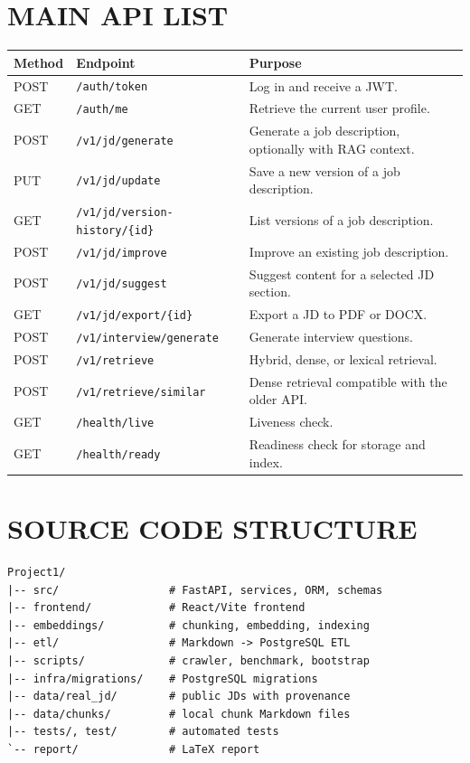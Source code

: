 \documentclass[12pt,a4paper,oneside]{report}
\newcommand{\code}[1]{\texttt{#1}}
\begin{document}
\chapter{MAIN API LIST}
\label{app:api}
\begin{longtable}{p{2cm}p{5.4cm}p{7cm}}
\toprule
\textbf{Method} & \textbf{Endpoint} & \textbf{Purpose}\\
\midrule
POST & \code{/auth/token} & Log in and receive a JWT.\\
GET & \code{/auth/me} & Retrieve the current user profile.\\
POST & \code{/v1/jd/generate} & Generate a job description, optionally with RAG context.\\
PUT & \code{/v1/jd/update} & Save a new version of a job description.\\
GET & \code{/v1/jd/version-history/\{id\}} & List versions of a job description.\\
POST & \code{/v1/jd/improve} & Improve an existing job description.\\
POST & \code{/v1/jd/suggest} & Suggest content for a selected JD section.\\
GET & \code{/v1/jd/export/\{id\}} & Export a JD to PDF or DOCX.\\
POST & \code{/v1/interview/generate} & Generate interview questions.\\
POST & \code{/v1/retrieve} & Hybrid, dense, or lexical retrieval.\\
POST & \code{/v1/retrieve/similar} & Dense retrieval compatible with the older API.\\
GET & \code{/health/live} & Liveness check.\\
GET & \code{/health/ready} & Readiness check for storage and index.\\
\bottomrule
\end{longtable}

\chapter{SOURCE CODE STRUCTURE}
\begin{lstlisting}[caption={Main source-code structure}]
Project1/
|-- src/                 # FastAPI, services, ORM, schemas
|-- frontend/            # React/Vite frontend
|-- embeddings/          # chunking, embedding, indexing
|-- etl/                 # Markdown -> PostgreSQL ETL
|-- scripts/             # crawler, benchmark, bootstrap
|-- infra/migrations/    # PostgreSQL migrations
|-- data/real_jd/        # public JDs with provenance
|-- data/chunks/         # local chunk Markdown files
|-- tests/, test/        # automated tests
`-- report/              # LaTeX report
\end{lstlisting}
\end{document}
